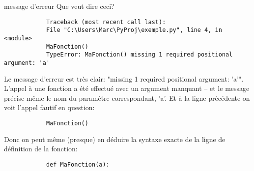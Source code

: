 \documentclass[12pt]{article}
\begin{document}
	\begin{MonQz}{message d'erreur}
		Que veut dire ceci?
		\begin{verbatim}
			Traceback (most recent call last):
			File "C:\Users\Marc\PyProj\exemple.py", line 4, in <module>
			MaFonction()
			TypeError: MaFonction() missing 1 required positional argument: 'a'
		\end{verbatim}
	\end{MonQz}
	\begin{MaReponse}
		Le message d'erreur est très clair: "missing 1 required positional argument: 'a'". L'appel à une fonction a été effectué avec un argument manquant -- et le message précise même le nom du paramètre correspondant, 'a'. Et à la ligne précédente on voit l'appel fautif en question:
		\begin{verbatim}
			MaFonction()
		\end{verbatim}
		Donc on peut même (presque) en déduire la syntaxe exacte de la ligne de définition de la fonction:
		\begin{verbatim}
			def MaFonction(a):
		\end{verbatim}
	\end{MaReponse}
\end{document}
